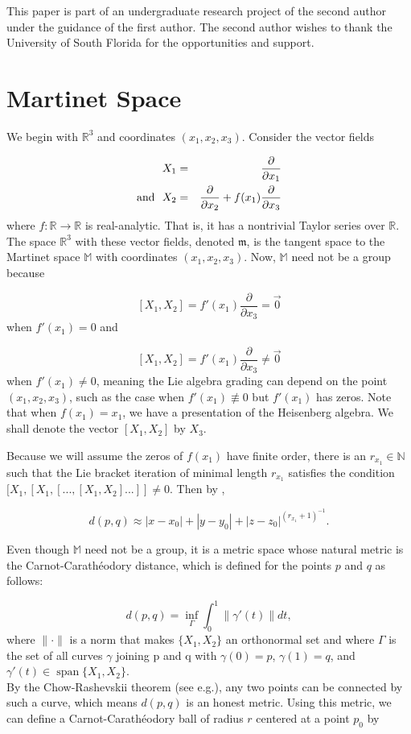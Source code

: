 \documentclass[reqno]{amsart}
\newcommand{\spn}{\operatorname{span}}
\begin{document}
This paper is part of an undergraduate research project of the second author under the guidance of the first author. The second author wishes to thank the University of South Florida for the opportunities and support.  

\section{Martinet Space}
We begin with $\mathbb{R}^3$ and coordinates $(x_1,x_2,x_3)$. Consider the vector fields

\begin{eqnarray*}
X_1& = & \frac{\partial}{\partial x_1}\\
\textmd{and\ \ } X_2 & = & \frac{\partial}{\partial x_2}+f(x_1)\frac{\partial}{\partial x_3}
\end{eqnarray*}
where $f:\mathbb{R}\to\mathbb{R}$ is real-analytic. That is, it has a nontrivial Taylor series over $\mathbb{R}$.
The space $\mathbb{R}^3$ with these vector fields, denoted $\mathfrak{m}$, is  the tangent space to the Martinet space $\mathbb{M}$ with coordinates $(x_1,x_2,x_3)$.
Now, $\mathbb{M}$ need not be a group because

\[[X_1,X_2]=f'(x_1)\frac{\partial}{\partial x_3}=\vec{0}\]
when $f'(x_1)=0$ and 

\[[X_1,X_2]=f'(x_1)\frac{\partial}{\partial x_3}\neq\vec{0}\]
when $f'(x_1)\neq0$, meaning the Lie algebra grading can depend on the point $(x_1,x_2,x_3)$, such as the case when $f'(x_1)\not\equiv 0$ but $f'(x_1)$ has zeros. Note that when $f(x_1)=x_1$, we have a presentation of the Heisenberg algebra. We shall denote the vector $[X_1,X_2]$ by $X_3$. 

Because we will assume the zeros of $f(x_1)$ have finite order, there is an $r_{x_1}\in\mathbb{N}$ such that the Lie bracket iteration of minimal length $r_{x_1}$ satisfies the condition $[X_1,[X_1,[...,[X_1,X_2]...]]\neq0$. Then by \cite[Theorem 7.34]{BR:SRG},

\begin{equation}\label{distest}
d(p,q)\approx|x-x_0|+|y-y_0|+|z-z_0|^{(r_{x_1}+1)^{-1}}.
\end{equation}

Even though $\mathbb{M}$ need not be a group, it is a metric space whose natural metric is the Carnot-Carath\'{e}odory distance, which is defined for the points $p$ and $q$ as follows:

\[d(p,q)=\inf_\Gamma\int_0^1\|\gamma'(t)\|dt,\]
where $\|\cdot\|$ is a norm that makes $\{X_1,X_2\}$ an orthonormal set and where $\Gamma$ is the set of all curves $\gamma$ joining p and q with $\gamma(0)=p$, 
$\gamma(1)=q$, and $\gamma'(t)\in\spn\{X_1,X_2\}$.\\
By the Chow-Rashevskii theorem (see e.g.\cite{BR:SRG}), any two points can be connected by such a curve, which means $d(p,q)$ is an honest metric. Using this metric, we can define a Carnot-Carath\'{e}odory ball of radius $r$ centered at a point $p_0$ by
\end{document}

